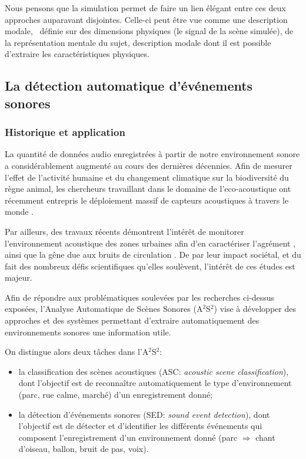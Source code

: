 Nous pensons que la simulation permet de faire un lien élégant entre ces deux approches auparavant disjointes. Celle-ci peut être vue comme une description modale, \ie~définie sur des dimensions physiques (le signal de la scène simulée), de la représentation mentale du sujet, description modale dont il est possible d'extraire les caractéristiques physiques.


\subsection{La détection automatique d'événements sonores}
\label{ch1_SED}

\subsubsection{Historique et application}

La quantité de données audio enregistrées à partir de notre environnement sonore a considérablement augmenté au cours des dernières décennies. Afin de mesurer l'effet de l'activité humaine et du changement climatique sur la biodiversité du règne animal, les chercheurs travaillant dans le domaine de l'eco-acoustique \citep{ecoacoustic2014,krause} ont récemment entrepris le déploiement massif de capteurs acoustiques à travers le monde \citep{warren2006urban,nessSST13,stowell13a,stowell13b}.

Par ailleurs, des travaux récents démontrent l'intérêt de monitorer l'environnement acoustique des zones urbaines afin d'en caractériser l'agrément  \citep{guyot2005urban,ricciardi2015sound}, ainsi que la gêne due aux bruits de circulation \citep{gloaguen2016}. De par leur impact sociétal, et du fait des nombreux défis scientifiques qu'elles soulèvent, l'intérêt de ces études est majeur.

Afin de répondre aux problématiques soulevées par les recherches ci-dessus exposées, l'Analyse Automatique de Scènes Sonores (A$^2$S$^2$) \citep{Stowell15} vise à développer des approches et des systèmes permettant d'extraire automatiquement des environnements sonores une information utile.

On distingue alors deux tâches dans l'A$^2$S$^2$:

\begin{itemize}
\item la classification des scènes acoustiques (ASC: \emph{acoustic scene classification}), dont l'objectif est de reconnaître automatiquement le type d'environnement (parc, rue calme, marché) d'un enregistrement donné;
\item la détection d'événements sonores (SED: \emph{sound event detection}), dont l'objectif est de détecter et d'identifier les différents événements qui composent l'enregistrement d'un environnement donné (parc $\Rightarrow$ chant d'oiseau, ballon, bruit de pas, voix).
\end{itemize}

